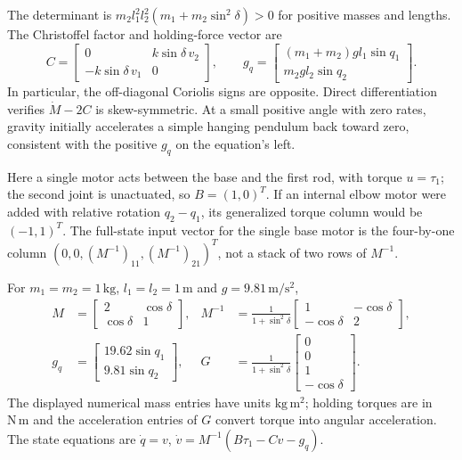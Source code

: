 The determinant is $m_2l_1^2l_2^2(m_1+m_2\sin^2\delta)>0$ for positive masses and lengths. The Christoffel factor and holding-force vector are
\begin{equation}
C=\begin{bmatrix}0&k\sin\delta\,v_2\\-k\sin\delta\,v_1&0\end{bmatrix},\qquad
g_q=\begin{bmatrix}(m_1+m_2)gl_1\sin q_1\\m_2gl_2\sin q_2\end{bmatrix}.
\label{eq:ch7:coriolis-matrix}
\end{equation}
\label{eq:ch7:grav-vector}
In particular, the off-diagonal Coriolis signs are opposite. Direct differentiation verifies $\dot M-2C$ is skew-symmetric. At a small positive angle with zero rates, gravity initially accelerates a simple hanging pendulum back toward zero, consistent with the positive $g_q$ on the equation's left.

Here a single motor acts between the base and the first rod, with torque $u=\tau_1$; the second joint is unactuated, so $B=(1,0)^T$. If an internal elbow motor were added with relative rotation $q_2-q_1$, its generalized torque column would be $(-1,1)^T$. The full-state input vector for the single base motor is the four-by-one column $(0,0,(M^{-1})_{11},(M^{-1})_{21})^T$, not a stack of two rows of $M^{-1}$.

For $m_1=m_2=1\,\mathrm{kg}$, $l_1=l_2=1\,\mathrm m$ and $g=9.81\,\mathrm{m/s^2}$,
\begin{equation}
\begin{aligned}
M&=\begin{bmatrix}2&\cos\delta\\\cos\delta&1\end{bmatrix},&
M^{-1}&=\frac1{1+\sin^2\delta}\begin{bmatrix}1&-\cos\delta\\-\cos\delta&2\end{bmatrix},\\
g_q&=\begin{bmatrix}19.62\sin q_1\\9.81\sin q_2\end{bmatrix},&
G&=\frac1{1+\sin^2\delta}\begin{bmatrix}0\\0\\1\\-\cos\delta\end{bmatrix}.
\end{aligned}
\label{eq:ch7:mass-matrix-numeric}
\end{equation}
\label{eq:ch7:double-pend-params}
\label{eq:ch7:mass-matrix-inverse}
\label{eq:ch7:coriolis-matrix-numeric}
\label{eq:ch7:grav-vector-numeric}
\label{eq:ch7:input-matrix}
The displayed numerical mass entries have units $\mathrm{kg\,m^2}$; holding torques are in $\mathrm{N\,m}$ and the acceleration entries of $G$ convert torque into angular acceleration. The state equations are $\dot q=v$, $\dot v=M^{-1}(B\tau_1-Cv-g_q)$.

